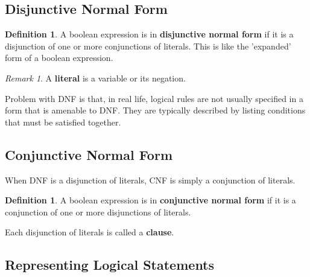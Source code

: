 \documentclass[12pt,a4paper]{article}
\theoremstyle{plain}
\theoremstyle{definition}
\newtheorem{definition}[theorem]{Definition}
\theoremstyle{remark}
\newtheorem{remark}[theorem]{Remark}
\begin{document}
\subsection{Disjunctive Normal Form}

\begin{definition}
A boolean expression is in \textbf{disjunctive normal form} if it is a disjunction of one or more conjunctions of literals. This is like the 'expanded' form of a boolean expression.
\end{definition}

\begin{remark}
A \textbf{literal} is a variable or its negation.
\end{remark}

Problem with DNF is that, in real life, logical rules are not usually specified
in a form that is amenable to DNF. They are typically described by listing conditions that
must be satisfied together. 

\subsection{Conjunctive Normal Form}

When DNF is a disjunction of literals, CNF is simply a conjunction of literals.

\begin{definition}
A boolean expression is in \textbf{conjunctive normal form} if it is a conjunction of one or more disjunctions of literals.
\end{definition}

Each disjunction of literals is called a \textbf{clause}.

\subsection{Representing Logical Statements}
\end{document}
